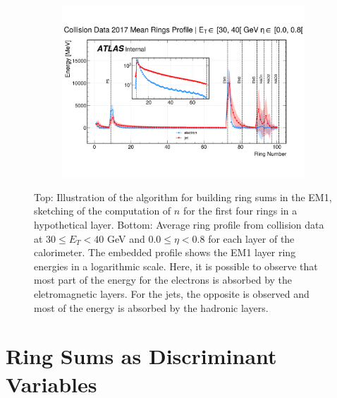 \begin{figure}[!ht]
\begin{center}
  \begin{subfigure}[c]{.7\textwidth}
  \centering
  \includegraphics[width=1.1\textwidth]{sections/03_ringer/figures/reco_steps/data17_zee_mean_rings_profiles_et2_eta0.pdf}
  \caption{}
  \label{fig:building_rings_b}
  \end{subfigure}
  \caption{
  Top: Illustration of the \fastcalo algorithm for building ring sums in the EM1, sketching of the computation of $n$ for the first four rings in a hypothetical layer.
  	Bottom: Average ring profile from collision data at $30 \leq E_T < 40$ GeV and $0.0 \leq \eta < 0.8$ for each layer of the calorimeter. The embedded profile shows the EM1 layer ring energies in a logarithmic scale. Here, it is possible to observe that most part of the energy for the electrons is absorbed by the eletromagnetic layers. For the jets, the opposite is observed and most of the energy is absorbed by the hadronic layers.}
  \end{center}
\end{figure}





\section{Ring Sums as Discriminant Variables}\label{ssec:ringer_id}



